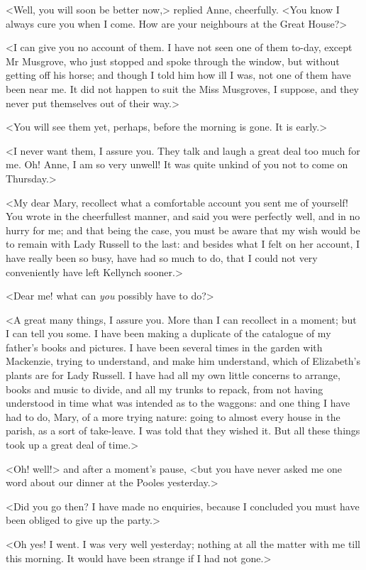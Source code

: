 <Well, you will soon be better now,> replied Anne, cheerfully. <You know I always cure you when I come. How are your neighbours at the Great House?>

<I can give you no account of them. I have not seen one of them to-day, except Mr Musgrove, who just stopped and spoke through the window, but without getting off his horse; and though I told him how ill I was, not one of them have been near me. It did not happen to suit the Miss Musgroves, I suppose, and they never put themselves out of their way.>

<You will see them yet, perhaps, before the morning is gone. It is early.>

<I never want them, I assure you. They talk and laugh a great deal too much for me. Oh! Anne, I am so very unwell! It was quite unkind of you not to come on Thursday.>

<My dear Mary, recollect what a comfortable account you sent me of yourself! You wrote in the cheerfullest manner, and said you were perfectly well, and in no hurry for me; and that being the case, you must be aware that my wish would be to remain with Lady Russell to the last: and besides what I felt on her account, I have really been so busy, have had so much to do, that I could not very conveniently have left Kellynch sooner.>

<Dear me! what can \textit{you} possibly have to do?>

<A great many things, I assure you. More than I can recollect in a moment; but I can tell you some. I have been making a duplicate of the catalogue of my father's books and pictures. I have been several times in the garden with Mackenzie, trying to understand, and make him understand, which of Elizabeth's plants are for Lady Russell. I have had all my own little concerns to arrange, books and music to divide, and all my trunks to repack, from not having understood in time what was intended as to the waggons: and one thing I have had to do, Mary, of a more trying nature: going to almost every house in the parish, as a sort of take-leave. I was told that they wished it. But all these things took up a great deal of time.>

<Oh! well!> and after a moment's pause, <but you have never asked me one word about our dinner at the Pooles yesterday.>

<Did you go then? I have made no enquiries, because I concluded you must have been obliged to give up the party.>

<Oh yes! I went. I was very well yesterday; nothing at all the matter with me till this morning. It would have been strange if I had not gone.>

